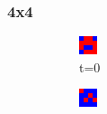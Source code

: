 \documentclass[a4paper, 11pt]{article}
\begin{document}
\subsubsection{4x4}
\begin{figure}[H]
\centering
\begin{subfigure}{.25\textwidth}
  \centering
  \includegraphics[width=0.9\linewidth]{SNOWDRIFT_MOORE_4x4_t00}
  \caption{t=0}
\end{subfigure}%
\begin{subfigure}{.25\textwidth}
  \centering
  \includegraphics[width=0.9\linewidth]{SNOWDRIFT_MOORE_4x4_t01}

\end{subfigure}
\end{figure}
\end{document}
